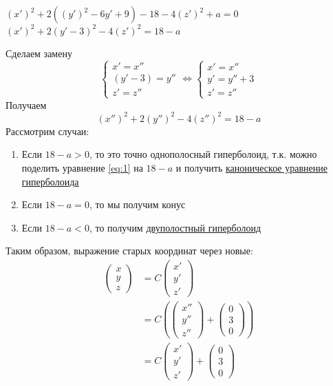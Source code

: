 \documentclass[a4paper]{article}
\begin{document}
\begin{center}
    $(x')^2+2\left((y')^2-6y'+9\right)-18-4(z')^2+a=0$\\[2mm]
    $(x')^2+2(y'-3)^2-4(z')^2=18-a$
\end{center}
Сделаем замену $$\begin{cases}
    x'=x''\\
    (y'-3)=y''\\
    z'=z''
\end{cases}\Longleftrightarrow\begin{cases}
    x'=x''\\
    y'=y''+3\\
    z'=z''
\end{cases}$$
Получаем
\begin{equation}\label{eq:1}
    (x'')^2+2(y'')^2-4(z'')^2=18-a
\end{equation}
Рассмотрим случаи:
\begin{enumerate}
    \item Если $18-a>0$, то это точно однополосный гиперболоид, т.к. можно поделить уравнение \ref{eq:1} на $18-a$ и получить \href{https://cf.ppt-online.org/files/slide/e/EtDYxu4J1PBMHOnvFjdN9XrKephwIfS82yUlcm/slide-10.jpg}{каноническое уравнение гиперболоида}
    \item Если $18-a=0$, то мы получим конус
    \item Если $18-a<0$, то получим \href{https://cf.ppt-online.org/files1/slide/a/a8fSsCDgw0o64mQKNFPlhEWLUrO37zB9iGJTybIkt/slide-22.jpg}{двуполостный гиперболоид}
\end{enumerate}
Таким образом, выражение старых координат через новые:
$$\begin{aligned}
    \begin{pmatrix}
        x\\
        y\\
        z
    \end{pmatrix}&=C\begin{pmatrix}
        x'\\
        y'\\
        z'
    \end{pmatrix}\\
    &=C\left(\begin{pmatrix}
        x''\\
        y''\\
        z''
    \end{pmatrix}+\begin{pmatrix}
        0\\
        3\\
        0
    \end{pmatrix}\right)\\
    &=C\begin{pmatrix}
        x'\\
        y'\\
        z'
    \end{pmatrix}+\begin{pmatrix}
        0\\
        3\\
        0
    \end{pmatrix}
\end{aligned}$$
\end{document}
